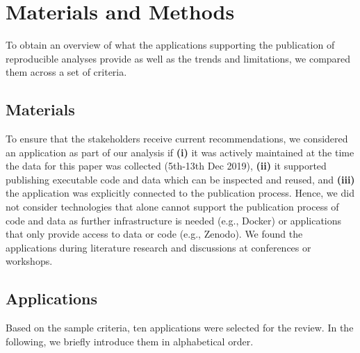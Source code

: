 \documentclass[onecolumn]{article}
\begin{document}
\hypertarget{materials-and-methods}{%
\section{Materials and Methods}\label{materials-and-methods}}

To obtain an overview of what the applications supporting the
publication of reproducible analyses provide as well as the trends and
limitations, we compared them across a set of criteria.

\hypertarget{materials}{%
\subsection{Materials}\label{materials}}

To ensure that the stakeholders receive current recommendations, we
considered an application as part of our analysis if \textbf{(i)} it was
actively maintained at the time the data for this paper was collected
(5th-13th Dec 2019), \textbf{(ii)} it supported publishing executable
code and data which can be inspected and reused, and \textbf{(iii)} the
application was explicitly connected to the publication process. Hence,
we did not consider technologies that alone cannot support the
publication process of code and data as further infrastructure is needed
(e.g., Docker) or applications that only provide access to data or code
(e.g., Zenodo). We found the applications during literature research and
discussions at conferences or workshops.

\hypertarget{applications}{%
\subsection{Applications}\label{applications}}

Based on the sample criteria, ten applications were selected for the
review. In the following, we briefly introduce them in alphabetical
order.
\end{document}
